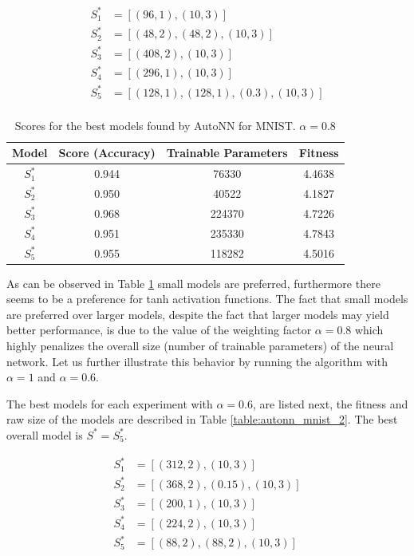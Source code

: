 \documentclass[journal]{IEEEtran}
\begin{document}
\begin{align*}
S^*_1 & = \left[ (96, 1), (10, 3) \right] \\
S^*_2 & = \left[ (48, 2), (48, 2), (10, 3) \right] \\
S^*_3 & = \left[ (408, 2), (10, 3) \right] \\
S^*_4 & = \left[ (296, 1),  (10, 3) \right] \\
S^*_5 & = \left[ (128, 1), (128, 1), (0.3),  (10, 3) \right] \\
\end{align*}

\begin{table}[!htb]
\begin{center}
\begin{tabular}{| c | c | c | c |}
\hline
Model & Score (Accuracy) & Trainable Parameters & Fitness\\
\hline
$S^*_1$ & 0.944 & 76330 & 4.4638\\
$S^*_2$ & 0.950 & 40522 & 4.1827\\
$S^*_3$ & 0.968 & 224370 & 4.7226\\
$S^*_4$ & 0.951 & 235330 & 4.7843\\
$S^*_5$ & 0.955 & 118282 & 4.5016\\
\hline
\end{tabular}
\end{center}
\caption{Scores for the best models found by AutoNN for MNIST. $\alpha = 0.8$}
\label{table:autonn_mnist_1}
\end{table}

As can be observed in Table \ref{table:autonn_mnist_1} small models are preferred, furthermore there seems to be a preference for tanh activation functions. The fact that small models are preferred over larger models, despite the fact that larger models may yield better performance, is due to the value of the weighting factor $\alpha = 0.8$ which highly penalizes the overall size (number of trainable parameters) of the neural network.  Let us further illustrate this behavior by running the algorithm with $\alpha = 1$ and $\alpha = 0.6$.

The best models for each experiment with $\alpha = 0.6$, are listed next, the fitness and raw size of the models are described in Table \ref{table:autonn_mnist_2}. The best overall model is $S^* = S^*_5$.

\begin{align*}
S^*_1 & = \left[ (312, 2), (10, 3) \right] \\
S^*_2 & = \left[ (368, 2), (0.15), (10, 3) \right] \\
S^*_3 & = \left[ (200, 1), (10, 3) \right] \\
S^*_4 & = \left[ (224, 2),  (10, 3) \right] \\
S^*_5 & = \left[ (88, 2), (88, 2), (10, 3) \right] \\
\end{align*}
\end{document}

